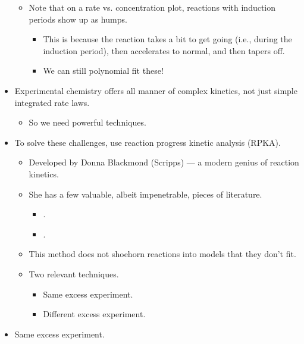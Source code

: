 \documentclass[../notes.tex]{subfiles}
\begin{document}
\begin{itemize}
\begin{itemize}
        \item Note that on a rate vs. concentration plot, reactions with induction periods show up as humps.
        \begin{itemize}
            \item This is because the reaction takes a bit to get going (i.e., during the induction period), then accelerates to normal, and then tapers off.
            \item We can still polynomial fit these!
        \end{itemize}
    \end{itemize}
    \item Experimental chemistry offers all manner of complex kinetics, not just simple integrated rate laws.
    \begin{itemize}
        \item So we need powerful techniques.
    \end{itemize}
    \item To solve these challenges, use reaction progress kinetic analysis (RPKA).
    \begin{itemize}
        \item Developed by Donna Blackmond (Scripps) --- a modern genius of reaction kinetics.
        \item She has a few valuable, albeit impenetrable, pieces of literature.
        \begin{itemize}
            \item \textcite{bib:RPKA1}.
            \item \textcite{bib:RPKA2}.
        \end{itemize}
        \item This method does not shoehorn reactions into models that they don't fit.
        \item Two relevant techniques.
        \begin{itemize}
            \item Same excess experiment.
            \item Different excess experiment.
        \end{itemize}
    \end{itemize}
    \item Same excess experiment.
    \begin{figure}[h!]
        \centering
        \begin{subfigure}[b]{0.4\linewidth}
            \centering
\end{subfigure}
\end{figure}
\end{itemize}
\end{document}
